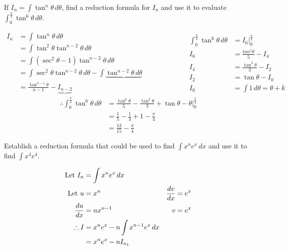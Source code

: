 \documentclass{standalone}
\begin{document}
	\begin{example}
		If $I_n = \int \tan^n\theta \, d\theta$, find a reduction formula for $I_n$ and use it to evaluate $\int_0^{\frac\pi4} \tan^6\theta\,d\theta$.
	\end{example}

	\begin{equation*}
	\begin{split}
		I_n &= \int \tan^n\theta \, d\theta\\
			&= \int \tan^2\theta \tan^{n-2}\theta\, d\theta\\
			&= \int (\sec^2\theta - 1) \tan^{n-2}\theta\, d\theta\\
			&= \int \sec^2\theta\tan^{n-2}\theta\,d\theta - \int \underbrace{\tan^{n-2}\theta\,d\theta}\\
			&= \frac{\tan^{n-1}\theta}{n-1} - \underbrace{I_{n-2}}
	\end{split}
\qquad\qquad\qquad
	\begin{split}
		\int_0^{\frac\pi4}\tan^6\theta\,d\theta &= I_6\bigg|_0^{\frac\pi4}\\
												  I_6 &= \frac{tan^5\theta}{5} - I_4\\
												  I_4 &= \frac{\tan^3\theta}{3} - I_2\\		
												  I_2 &= \tan\theta - I_0\\
												  I_0 &= \int 1 \, d\theta = \theta + k
	\end{split}
	\end{equation*}
\begin{align*}
	 \therefore \int_0^\frac\pi4  \tan^6\theta \, d\theta &=  \frac{\tan^6\theta}5 - \frac{\tan^3\theta}{3} + \tan\theta - \theta\bigg|_0^\frac\pi4\\
	 &= \frac15 - \frac13 + 1 - \frac{\pi}{4}\\
	 &= \frac{13}{15} - \frac{\pi}{4}
\end{align*}


	\begin{example}
		Establish a reduction formula that could be used to find $\int x^ne^x \, dx$ and use it to find $\int x^4e^4$.
	\end{example}
	
	\begin{align*}
		\text{Let } I_n & = \int x^ne^x \, dx \\
		\text{Let } u & = x^n      & \frac{dv}{dx} = e^x \\
		\frac{du}{dx}     & = nx^{n-1} & v = e^x         \\
		\therefore I &= x^ne^x - n \int x^{n-1}e^x \, dx\\
		&= x^ne^x - nI_{n_{1}}
	\end{align*}
	
\end{document}
